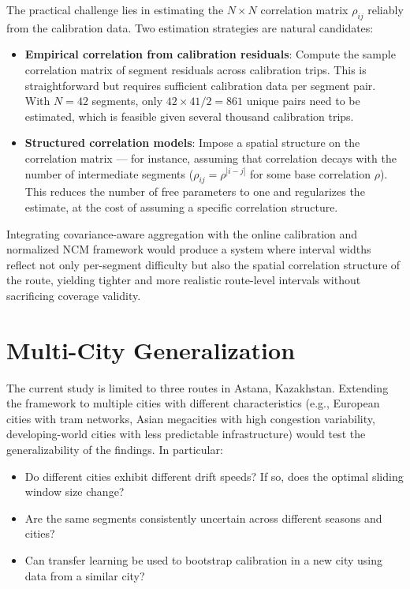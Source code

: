 The practical challenge lies in estimating the $N \times N$ correlation matrix $\rho_{ij}$ reliably from the calibration data. Two estimation strategies are natural candidates:
\begin{itemize}
    \item \textbf{Empirical correlation from calibration residuals}: Compute the sample correlation matrix of segment residuals across calibration trips. This is straightforward but requires sufficient calibration data per segment pair. With $N = 42$ segments, only $42 \times 41 / 2 = 861$ unique pairs need to be estimated, which is feasible given several thousand calibration trips.
    \item \textbf{Structured correlation models}: Impose a spatial structure on the correlation matrix --- for instance, assuming that correlation decays with the number of intermediate segments ($\rho_{ij} = \rho^{|i-j|}$ for some base correlation $\rho$). This reduces the number of free parameters to one and regularizes the estimate, at the cost of assuming a specific correlation structure.
\end{itemize}

Integrating covariance-aware aggregation with the online calibration and normalized NCM framework would produce a system where interval widths reflect not only per-segment difficulty but also the spatial correlation structure of the route, yielding tighter and more realistic route-level intervals without sacrificing coverage validity.


\section{Multi-City Generalization}
\label{sec:fw_multi_city}

The current study is limited to three routes in Astana, Kazakhstan. Extending the framework to multiple cities with different characteristics (e.g., European cities with tram networks, Asian megacities with high congestion variability, developing-world cities with less predictable infrastructure) would test the generalizability of the findings. In particular:

\begin{itemize}
    \item Do different cities exhibit different drift speeds? If so, does the optimal sliding window size change?
    \item Are the same segments consistently uncertain across different seasons and cities?
    \item Can transfer learning be used to bootstrap calibration in a new city using data from a similar city?
\end{itemize}


